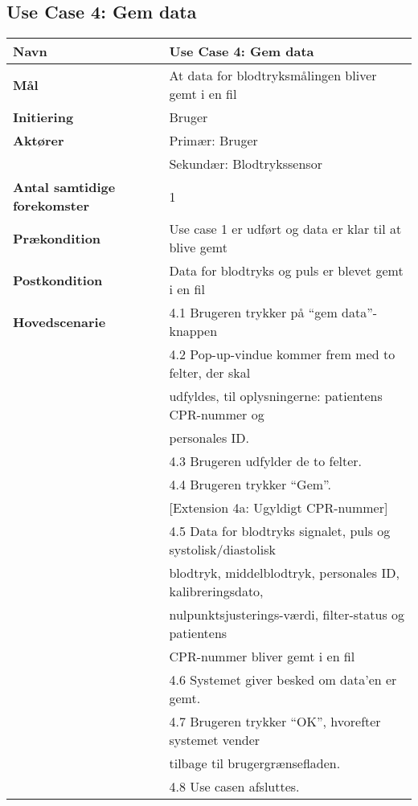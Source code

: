 \subsection{Use Case 4: Gem data}
\vspace{0.8 cm}
\begin{table}[h!]
	\begin{tabular}{l|l}
		\rowcolor[HTML]{A9D9F9} 
		\textbf{Navn} & Use Case 4: Gem data \\
		\hline
		\textbf{Mål} & At data for blodtryksmålingen bliver gemt i en fil \\
		\hline
		\rowcolor[HTML]{A9D9F9} 
		\textbf{Initiering} & Bruger \\
		\hline
		\textbf{Aktører} & Primær: Bruger \\
		\textbf{} & Sekundær: Blodtrykssensor \\
		\hline
		\rowcolor[HTML]{A9D9F9} 
		\textbf{Antal samtidige forekomster} & 1 \\
		\hline
		\textbf{Prækondition} & Use case 1 er udført og data er klar til at blive gemt \\
		\hline
		\rowcolor[HTML]{A9D9F9} 
		\textbf{Postkondition} & Data for blodtryks og puls er blevet gemt i en fil \\
		\hline
		\textbf{Hovedscenarie} & 4.1 Brugeren trykker på “gem data”-knappen \\
		& 4.2 Pop-up-vindue kommer frem med to felter, der skal \\
		& udfyldes, til oplysningerne: patientens CPR-nummer og \\
		& personales ID. \\
		& 4.3 Brugeren udfylder de to felter. \\
		& 4.4 Brugeren trykker “Gem”. \\
		& {[}Extension 4a: Ugyldigt CPR-nummer{]} \\
		& 4.5 Data for blodtryks signalet, puls og systolisk/diastolisk \\
		& blodtryk, middelblodtryk, personales ID, kalibreringsdato, \\
		& nulpunktsjusterings-værdi, filter-status og patientens \\
		& CPR-nummer bliver gemt i en fil \\
		& 4.6 Systemet giver besked om data’en er gemt. \\
		& 4.7 Brugeren trykker “OK”, hvorefter systemet vender \\
		& tilbage til brugergrænsefladen. \\
		& 4.8 Use casen afsluttes. \\

\end{tabular}
\end{table}
